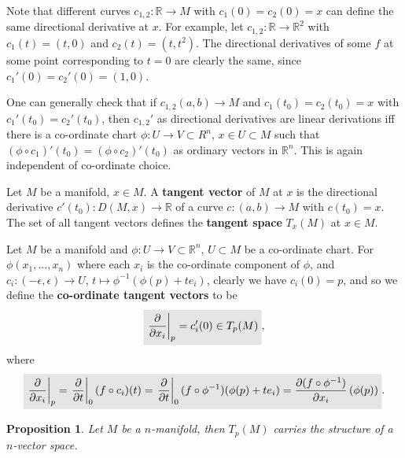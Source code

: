 \documentclass[letter-paper]{tufte-book}
\newtheorem{proposition}[theorem]{\color{pastel-blue}Proposition}
\newenvironment{example}[1][Example]{\begin{trivlist}
\item[\hskip \labelsep {\bfseries #1}]}{\end{trivlist}}
\newcommand{\highlight}[1]{\mathchoice%
  {\colorbox{black!10}{$\displaystyle#1$}}%
  {\colorbox{black!10}{$\textstyle#1$}}%
  {\colorbox{black!10}{$\scriptstyle#1$}}%
  {\colorbox{black!10}{$\scriptscriptstyle#1$}}}%
\begin{document}
\begin{example}
  Note that different curves $c_{1,2}:\mathbb{R}\to M$ with $c_1(0) = c_2(0) = x$ can define the same directional derivative at $x$. For example, let $c_{1,2} :\mathbb{R} \to \mathbb{R}^2$ with $c_1(t) = (t,0)$ and $c_2(t) = (t, t^2)$. The directional derivatives of some $f$ at some point corresponding to $t=0$ are clearly the same, since $c_1'(0) = c_2'(0) = (1,0)$.
\end{example}

One can generally check that if $c_{1,2}(a,b) \to M$ and $c_1(t_0) = c_2(t_0) = x$ with $c_1'(t_0) = c_2'(t_0)$, then $c_{1,2}'$ as directional derivatives are linear derivations iff there is a co-ordinate chart $\phi:U\to V\subset{R}^n$, $x\in U\subset M$ such that $(\phi\circ c_1)'(t_0) = (\phi\circ c_2)'(t_0)$ as ordinary vectors in $\mathbb{R}^n$. This is again independent of co-ordinate choice.

Let $M$ be a manifold, $x\in M$. A \textbf{tangent vector} of $M$ at $x$ is the directional derivative $c'(t_0):D(M, x) \to \mathbb{R}$ of a curve $c:(a,b)\to M$ with $c(t_0) = x$. The set of all tangent vectors defines the \textbf{tangent space} $T_x(M)$ at $x\in M$.

Let $M$ be a manifold and $\phi : U \to V \subset \mathbb{R}^n$, $U \subset M$ be a co-ordinate chart. For $\phi(x_1, \ldots, x_n)$ where each $x_i$ is the co-ordinate component of $\phi$, and $c_i:(-\epsilon, \epsilon) \to U$, $t\mapsto \phi^{-1}\left(\phi(p) + te_i\right)$, clearly we have $c_i(0) = p$, and so we define the \textbf{co-ordinate tangent vectors} to be
\begin{equation}
  \highlight{\left.\frac{\partial}{\partial x_i}\right|_p = c_i'(0) \in T_p(M)},
\end{equation}
where
\begin{equation}
  \highlight{\left.\frac{\partial}{\partial x_i}\right|_p = \left.\frac{\partial}{\partial t}\right|_0 (f\circ c_i)(t) = \left.\frac{\partial}{\partial t}\right|_0 (f\circ \phi^{-1})(\phi(p) + te_i) = \frac{\partial(f\circ \phi^{-1})}{\partial x_i}\left(\phi(p)\right)}.
\end{equation}

\begin{proposition}
  Let $M$ be a $n$-manifold, then $T_p(M)$ carries the structure of a $n$-vector space.
\end{proposition}
\end{document}
